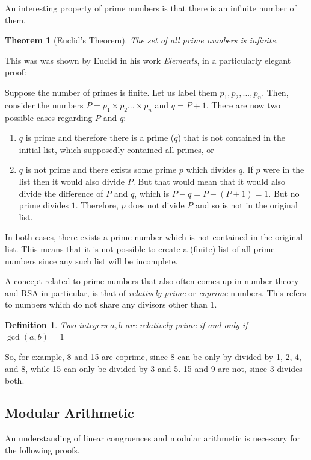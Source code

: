 \documentclass[12pt, titlepage]{article}
\newtheorem{theorem}{Theorem}
\newtheorem*{definition}{Definition}
\begin{document}
    An interesting property of prime numbers is that there is an infinite number of them. 
    \begin{theorem}[Euclid's Theorem]
        The set of all prime numbers is infinite.
    \end{theorem}
%
    This was was shown by Euclid in his work \emph{Elements}, in a particularly elegant
    proof\autocite[19]{dence}:

    Suppose the number of primes is finite. Let us label them $p_1, p_2, ..., p_n$. Then,
    consider the numbers $P = p_1\times p_2 ... \times p_n$ and $q = P + 1$. There are now
    two possible cases regarding $P$ and $q$:
    \begin{enumerate}[label=\alph*)]
        \item $q$ is prime and therefore there is a prime ($q$) that is not contained in the
            initial list, which supposedly contained all primes, or
        \item $q$ is not prime and there exists some prime $p$ which divides $q$. If $p$
            were in the list then it would also divide $P$. But that would mean that it
            would also divide the difference of $P$ and $q$, which is $P - q = P - (P + 1) =
            1$. But no prime divides $1$.  Therefore, $p$ does not divide $P$ and so is not
            in the original list.
    \end{enumerate}
    In both cases, there exists a prime number which is not contained in the original list.
    This means that it is not possible to create a (finite) list of all prime numbers since
    any such list will be incomplete.
        
    A concept related to prime numbers that also often comes up in number theory and RSA in
    particular, is that of \emph{relatively prime} or \emph{coprime} numbers. This refers to
    numbers which do not share any divisors other than 1.
    \begin{definition}
        Two integers $a, b$ are relatively prime if and only if $\gcd(a, b) = 1$
    \end{definition}
    So, for example, 8 and 15 are coprime, since 8 can be only by divided by 1, 2, 4, and 8,
    while 15 can only be divided by 3 and 5. 15 and 9 are not, since 3 divides both.

    \subsection{Modular Arithmetic}
    An understanding of linear congruences and modular arithmetic is necessary for the
    following proofs.
\end{document}
